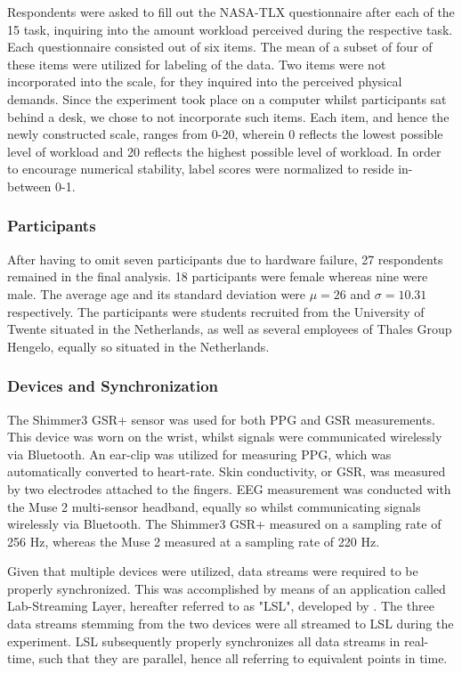 \documentclass[fleqn,11pt]{paper}
\begin{document}
Respondents were asked to fill out the NASA-TLX questionnaire after each of the 15 task, inquiring into the amount workload perceived during the respective task. Each questionnaire consisted out of six items. The mean of a subset of four of these items were utilized for labeling of the data. Two items were not incorporated into the scale, for they inquired into the perceived physical demands. Since the experiment took place on a computer whilst participants sat behind a desk, we chose to not incorporate such items. Each item, and hence the newly constructed scale, ranges from 0-20, wherein 0 reflects the lowest possible level of workload and 20 reflects the highest possible level of workload.  In order to encourage numerical stability, label scores were normalized to reside in-between 0-1. 

\subsubsection*{Participants}
After having to omit seven participants due to hardware failure, 27 respondents remained in the final analysis.  18 participants were female whereas nine were male. The average age and its standard deviation were $\mu =26$ and $\sigma = 10.31$ respectively. The participants were students recruited from the University of Twente situated in the Netherlands, as well as several employees of Thales Group Hengelo, equally so situated in the Netherlands. 

\subsubsection*{Devices and Synchronization}
The Shimmer3 GSR+ sensor was used for both PPG and GSR measurements. This device was worn on the wrist, whilst signals were communicated wirelessly via Bluetooth. An ear-clip was utilized for measuring PPG, which was automatically converted to heart-rate. Skin conductivity, or GSR, was measured by two electrodes attached to the fingers. EEG measurement was conducted with the Muse 2 multi-sensor headband, equally so whilst communicating signals wirelessly via Bluetooth. The Shimmer3 GSR+ measured on a sampling rate of 256 Hz, whereas the Muse 2 measured at a sampling rate of 220 Hz. 

Given that multiple devices were utilized, data streams were required to be properly synchronized. This was accomplished by means of an application called Lab-Streaming Layer, hereafter referred to as "LSL", developed by . The three data streams stemming from the two devices were all streamed to LSL during the experiment. LSL subsequently properly synchronizes all data streams in real-time,  such that they are parallel, hence all referring to equivalent points in time. 
\end{document}
